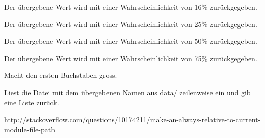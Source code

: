 \documentclass[a4paper,12pt,oneside]{sphinxmanual}
\begin{document}

\begin{fulllineitems}
\label{module:pyzufall.helfer.e16}
Der übergebene Wert wird mit einer Wahrscheinlichkeit von 16\% zurückgegeben.

\end{fulllineitems}


\begin{fulllineitems}
\label{module:pyzufall.helfer.e25}
Der übergebene Wert wird mit einer Wahrscheinlichkeit von 25\% zurückgegeben.

\end{fulllineitems}


\begin{fulllineitems}
\label{module:pyzufall.helfer.e50}
Der übergebene Wert wird mit einer Wahrscheinlichkeit von 50\% zurückgegeben.

\end{fulllineitems}


\begin{fulllineitems}
\label{module:pyzufall.helfer.e75}
Der übergebene Wert wird mit einer Wahrscheinlichkeit von 75\% zurückgegeben.

\end{fulllineitems}


\begin{fulllineitems}
\label{module:pyzufall.helfer.erste_gross}
Macht den ersten Buchstaben gross.

\end{fulllineitems}


\begin{fulllineitems}
\label{module:pyzufall.helfer.lese}
Liest die Datei mit dem übergebenen Namen aus data/ zeilenweise ein und gib eine Liste zurück.

\href{http://stackoverflow.com/questions/10174211/make-an-always-relative-to-current-module-file-path}{http://stackoverflow.com/questions/10174211/make-an-always-relative-to-current-module-file-path}

\end{fulllineitems}
\end{document}
